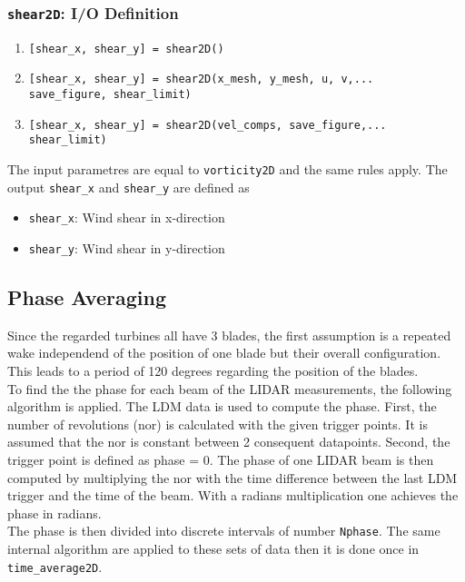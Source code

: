 \documentclass[
12pt,
a4paper,
twoside]
{article}
\begin{document}
\subsubsection{\texttt{shear2D}: I/O Definition}
\begin{enumerate}
\item \verb![shear_x, shear_y] = shear2D()!
\item \verb![shear_x, shear_y] = shear2D(x_mesh, y_mesh, u, v,...!\\
 \verb!save_figure, shear_limit)!
\item \verb![shear_x, shear_y] = shear2D(vel_comps, save_figure,...!\\ \verb!shear_limit)!
\end{enumerate}
The input parametres are equal to \verb!vorticity2D! and the same rules apply. The output \verb!shear_x! and \verb!shear_y! are defined as
\begin{itemize}
\item \verb!shear_x!: Wind shear in x-direction
\item \verb!shear_y!: Wind shear in y-direction
\end{itemize}

\subsection{Phase Averaging}
Since the regarded turbines all have 3 blades, the first assumption is a repeated wake independend of the position of one blade but their overall configuration. This leads to a period of 120 degrees regarding the position of the blades.\\
To find the the phase for each beam of the LIDAR measurements, the following algorithm is applied. The LDM data is used to compute the phase. First, the number of revolutions (nor) is calculated with the given trigger points. It is assumed that the nor is constant between 2 consequent datapoints. Second, the trigger point is defined as phase = 0. The phase of one LIDAR beam is then computed by multiplying the nor with the time difference between the last LDM trigger and the time of the beam. With a radians multiplication one achieves the phase in radians.\\
The phase is then divided into discrete intervals of number \verb!Nphase!. The same internal algorithm are applied to these sets of data then it is done once in\\ \verb!time_average2D!.
\end{document}
